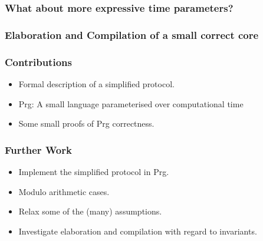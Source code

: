 \documentclass{beamer}
\begin{document}
\begin{frame}[fragile]
  \frametitle{What about more expressive time parameters?}
\end{frame}

\begin{frame}[fragile]
  \frametitle{Elaboration and Compilation of a small correct core}
\end{frame}

\begin{frame}[fragile]
  \frametitle{Contributions}
  \begin{itemize}
    \item Formal description of a simplified protocol.
    \item Prg: A small language parameterised over computational time
    \item Some small proofs of Prg correctness.
  \end{itemize}
\end{frame}

\begin{frame}[fragile]
  \frametitle{Further Work}
  \begin{itemize}
    \item Implement the simplified protocol in Prg.
    \item Modulo arithmetic cases.
    \item Relax some of the (many) assumptions.
    \item Investigate elaboration and compilation with regard to invariants.
  \end{itemize}
\end{frame}
\end{document}
